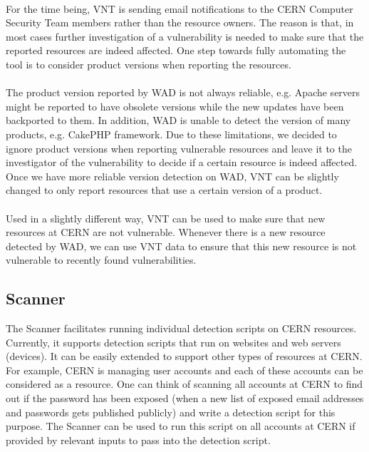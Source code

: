 \paragraph{}
For the time being, VNT is sending email notifications to the CERN Computer Security Team members rather than the resource owners. The reason is that, in most cases further investigation of a vulnerability is needed to make sure that the reported resources are indeed affected. One step towards fully automating the tool is to consider product versions when reporting the resources.
\paragraph{}
The product version reported by WAD is not always reliable, e.g. Apache servers might be reported to have obsolete versions while the new updates have been backported to them. In addition, WAD is unable to detect the version of many products, e.g. CakePHP framework. Due to these limitations, we decided to ignore product versions when reporting vulnerable resources and leave it to the investigator of the vulnerability to decide if a certain resource is indeed affected. Once we have more reliable version detection on WAD, VNT can be slightly changed to only report resources that use a certain version of a product.
\paragraph{}
Used in a slightly different way, VNT can be used to make sure that new resources at CERN are not vulnerable. Whenever there is a new resource detected by WAD, we can use VNT data to ensure that this new resource is not vulnerable to recently found vulnerabilities.
\subsection{Scanner}
The Scanner facilitates running individual detection scripts on CERN resources. Currently, it supports detection scripts that run on websites and web servers (devices). It can be easily extended to support other types of resources at CERN. For example, CERN is managing user accounts and each of these accounts can be considered as a resource. One can think of scanning all accounts at CERN to find out if the password has been exposed (when a new list of exposed email addresses and passwords gets published publicly) and write a detection script for this purpose. The Scanner can be used to run this script on all accounts at CERN if provided by relevant inputs to pass into the detection script.
\\